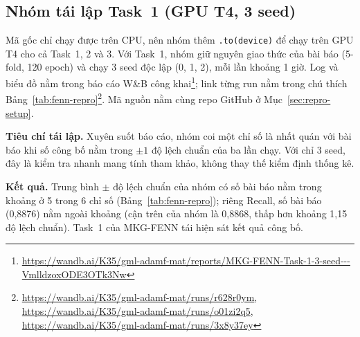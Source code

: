 \documentclass[conference]{IEEEtran}
\renewcommand{\hl}[1]{#1}
\renewcommand{\colorbox}[2]{#2}
\begin{document}
\subsection{Nhóm tái lập Task~1 (GPU T4, 3 seed)}
\label{sec:fenn-repro}
\noindent \hl{Mã gốc chỉ chạy được trên CPU, nên nhóm thêm} \colorbox{yellow}{\texttt{.to(device)}}
\hl{để chạy trên GPU T4 cho cả Task~1, 2 và 3. Với Task~1, nhóm giữ nguyên giao thức của bài báo (5-fold, 120 epoch)
và chạy 3 seed độc lập (0, 1, 2), mỗi lần khoảng 1 giờ. Log và biểu đồ nằm trong báo cáo W\&B công khai}\footnote{\url{https://wandb.ai/K35/gml-adamf-mat/reports/MKG-FENN-Task-1-3-seed---VmlldzoxODE3OTk3Nw}}\hl{;
link từng run nằm trong chú thích Bảng}\colorbox{yellow}{~\ref{tab:fenn-repro}}\footnote{\url{https://wandb.ai/K35/gml-adamf-mat/runs/r628r0ym}, \url{https://wandb.ai/K35/gml-adamf-mat/runs/o01zi2q5}, \url{https://wandb.ai/K35/gml-adamf-mat/runs/3x8y37ey}}\hl{.
Mã nguồn nằm cùng repo GitHub ở Mục}\colorbox{yellow}{~\ref{sec:repro-setup}}\hl{.}

\textbf{\hl{Tiêu chí tái lập.}} \hl{Xuyên suốt báo cáo, nhóm coi một chỉ số là nhất quán với bài báo khi số công bố nằm trong
$\pm 1$ độ lệch chuẩn của ba lần chạy. Với chỉ 3 seed, đây là kiểm tra nhanh mang tính tham khảo, không thay thế
kiểm định thống kê.}

\textbf{\hl{Kết quả.}} \hl{Trung bình} \colorbox{yellow}{$\pm$} \hl{độ lệch chuẩn của nhóm có số bài báo nằm trong khoảng ở 5 trong 6 chỉ số (Bảng}\colorbox{yellow}{~\ref{tab:fenn-repro}}\hl{);
riêng Recall, số bài báo (0,8876) nằm ngoài khoảng (cận trên của nhóm là 0,8868, thấp hơn khoảng 1,15 độ lệch chuẩn).
Task~1 của MKG-FENN tái hiện sát kết quả công bố.}
\end{document}
